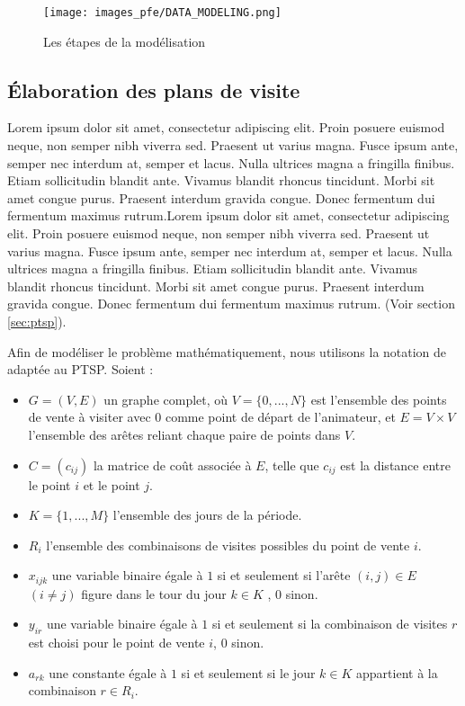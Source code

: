 \begin{figure}[hbt!]
  \centering
  \texttt{[image: images\_pfe/DATA\_MODELING.png]}
  \caption{Les étapes de la modélisation}
  \label{fig:data-modeling}
\end{figure}
\FloatBarrier

\subsection{Élaboration des plans de visite}
Lorem ipsum dolor sit amet, consectetur adipiscing elit. Proin posuere euismod neque, non semper nibh viverra sed. Praesent ut varius magna. Fusce ipsum ante, semper nec interdum at, semper et lacus. Nulla ultrices magna a fringilla finibus. Etiam sollicitudin blandit ante. Vivamus blandit rhoncus tincidunt. Morbi sit amet congue purus. Praesent interdum gravida congue. Donec fermentum dui fermentum maximus rutrum.Lorem ipsum dolor sit amet, consectetur adipiscing elit. Proin posuere euismod neque, non semper nibh viverra sed. Praesent ut varius magna. Fusce ipsum ante, semper nec interdum at, semper et lacus. Nulla ultrices magna a fringilla finibus. Etiam sollicitudin blandit ante. Vivamus blandit rhoncus tincidunt. Morbi sit amet congue purus. Praesent interdum gravida congue. Donec fermentum dui fermentum maximus rutrum. (Voir section \ref{sec:ptsp}).

\medskip
Afin de modéliser le problème mathématiquement, nous utilisons la notation de \parencite{cordeau_tabu_1997} adaptée au PTSP. Soient :

\begin{itemize}
    \item $G = (V, E)$ un graphe complet, où $V = \{0,...,N\}$ est l'ensemble des points de vente à visiter avec $0$ comme point de départ de l'animateur, et $E = V × V$ l'ensemble des arêtes reliant chaque paire de points dans $V$.
    \item $C = (c_{ij})$ la matrice de coût associée à $E$, telle que $c_{ij}$ est la distance entre le point $i$ et le point $j$.
    \item $K = \{1,...,M\}$ l'ensemble des jours de la période.
    \item $R_i$ l'ensemble des combinaisons de visites possibles du point de vente $i$.
    \item $x_{ijk}$ une variable binaire égale à $1$ si et seulement si l'arête $(i,j) \in E$ $(i \ne j)$ figure dans le tour du jour $k \in K$ , 0 sinon.
    \item $y_{ir}$ une variable binaire égale à $1$ si et seulement si la combinaison de visites $r$ est choisi pour le point de vente $i$, 0 sinon.
    \item $a_{rk}$ une constante égale à $1$ si et seulement si le jour $k \in K$ appartient à la combinaison $r \in R_i$.
\end{itemize}

